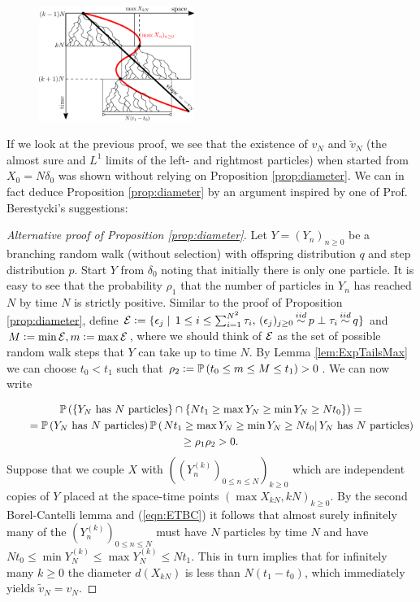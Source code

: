 \begin{figure}
\centering
\includegraphics[width=0.45\textwidth]{graphics/g1.png}
\end{figure}

If we look at the previous proof, we see that the existence of $v_N$ and $\tilde{v}_N$ (the almost sure and $L^1$ limits of the left- and rightmost particles) when started from $X_0 = N \delta_0$ was shown without relying on Proposition \ref{prop:diameter}. We can in fact deduce Proposition \ref{prop:diameter} by an argument inspired by one of Prof. Berestycki's suggestions:


\begin{proof}[Alternative proof of Proposition \ref{prop:diameter}]
Let $Y = (Y_n)_{n \geq 0}$ be a branching random walk (without selection) with offspring distribution $q$ and step distribution $p$. Start $Y$ from $\delta_{0}$ noting that initially there is only one particle. It is easy to see that the probability $\rho_1$ that the number of particles in $Y_n$ has reached $N$ by time $N$ is strictly positive. Similar to the proof of Proposition \ref{prop:diameter}, define $\cal{E} \defeq \{ \epsilon_j \mid\, 1 \leq i \leq \sum^{N^2}_{i=1} \tau_i,\, (\epsilon_j)_{j \geq 0} \stackrel{\mathclap{iid}}{\sim} p \perp \tau_i \stackrel{\mathclap{iid}}{\sim} q \}$ and $M \defeq \min\cal{E}, m \defeq \max\cal{E}$, where we should think of $\cal{E}$ as the set of possible random walk steps that $Y$ can take up to time $N$. By Lemma \ref{lem:ExpTailsMax} we can choose $t_0 < t_1$ such that $\rho_2 \defeq \Pr{t_0 \leq m \leq M \leq t_1} > 0$. We can now write

\begin{multline}\label{eqn:ETBC}
\Pr{\{Y_N \text{ has $N$ particles}\} \cap \{ N t_1 \geq \max Y_N \geq \min Y_N \geq N t_0\}} = \\
\qquad = \Pr{Y_N \text{ has $N$ particles}} \PrCond{N t_1 \geq \max Y_N \geq \min Y_N \geq N t_0}{Y_N \text{ has $N$ particles}} \\
\geq \rho_1 \rho_2 > 0. 
\end{multline}
Suppose that we couple $X$ with $((Y^{(k)}_n)_{0 \leq n \leq N})_{k \geq 0}$ which are independent copies of $Y$  placed at the space-time points $(\max X_{kN}, kN)_{k \geq 0}$. By the second Borel-Cantelli lemma and (\ref{eqn:ETBC}) it follows that almost surely infinitely many of the $(Y^{(k)}_n)_{0 \leq n \leq N}$ must have $N$ particles by time $N$ and have $N t_0 \leq \min Y^{(k)}_N \leq \max Y^{(k)}_N \leq N t_1$. This in turn implies that for infinitely many $k \geq 0$ the diameter $d(X_{kN})$ is less than $N(t_1 - t_0)$, which immediately yields $\tilde{v}_N = v_N$. 
\end{proof}

